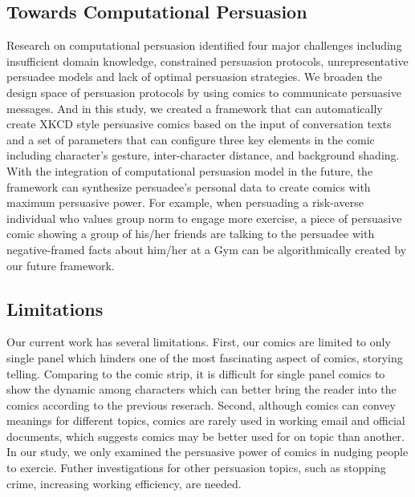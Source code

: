 \subsection{Towards Computational Persuasion}
Research on computational persuasion identified four major challenges including insufficient domain knowledge, constrained persuasion protocols, unrepresentative persuadee models and lack of optimal persuasion strategies\cite{huntertowards}. We broaden the design space of persuasion protocols by using comics to communicate persuasive messages. And in this study, we created a framework that can automatically create XKCD style persuasive comics based on the input of conversation texts and a set of parameters that can configure three key elements in the comic including character's gesture, inter-character distance, and background shading. With the integration of computational persuasion model in the future, the framework can synthesize persuadee's personal data to create comics with maximum persuasive power. For example, when persuading a risk-averse individual who values group norm to engage more exercise, a piece of persuasive comic showing a group of his/her friends are talking to the persuadee with negative-framed facts about him/her at a Gym can be algorithmically created by our future framework.

\subsection{Limitations}
Our current work has several limitations. First, our comics are limited to only single panel which hinders one of the most fascinating aspect of comics, storying telling. Comparing to the comic strip, it is difficult for single panel comics to show the dynamic among characters which can better bring the reader into the comics according to the previous reserach. Second, although comics can convey meanings for different topics, comics are rarely used in working email and official documents, which suggests comics may be better used for on topic than another. In our study, we only examined the persuasive power of comics in nudging people to exercie. Futher investigations for other persuasion topics, such as stopping crime, increasing working efficiency, are needed.
